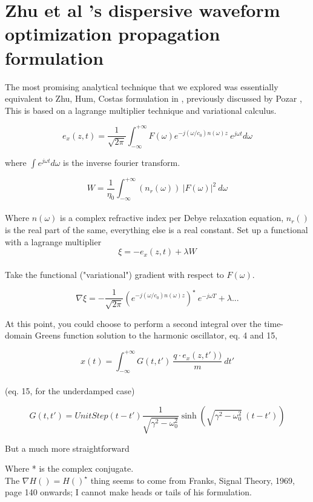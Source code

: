 \documentclass[paper.tex]{subfiles}
\begin{document}
\section{Zhu et al 's dispersive waveform optimization propagation formulation}

The most promising analytical technique that we explored was essentially equivalent to Zhu, Hum, Costas formulation in \cite{Microwave2012b}, previously discussed by Pozar \cite{Waveform2003}, This is based on a lagrange multiplier technique\cite{Methods1989} and variational calculus\footnotetext .

$$ e_x(z,t) = \frac{1}{\sqrt{2 \pi}} \int_{-\infty}^{+\infty}{F(\omega) e^{- j (\omega/c_0)n(\omega)z}\ e^{j\omega t} d\omega} $$

where $\int e^{j \omega t} d\omega$ is the inverse fourier transform.

$$W = \frac{1}{\eta_0} \int_{-\infty}^{+\infty}{(n_r(\omega))\ |F(\omega)|^2}\ d\omega$$\\

Where $n(\omega)$ is a complex refractive index per Debye relaxation equation, $n_r()$ is the real part of the same, everything else is a real constant. Set up a functional with a lagrange multiplier\\

$$\xi = -e_x(z,t) + \lambda W$$\\

Take the functional ("variational") gradient with respect to $F(\omega)$.

$$ \nabla \xi = -\frac{1}{\sqrt{2\pi}} \left(e^{- j (\omega/c_0)n(\omega)z}\right)^\star \  e^{-j\omega T} + \lambda...$$

At this point, you could choose to perform a second integral over the time-domain Greens function solution to the harmonic oscillator\cite{Complex2020}, eq. 4 and 15, 

$$x(t) = \int_{-\infty}^{+\infty}{G(t,t')\ \frac{q\cdot e_x(z,t'))}{m}\ } dt'$$\\

(eq. 15, for the underdamped case)

$$G(t,t') = UnitStep(t-t') \frac{1}{\sqrt{\gamma^2-\omega_0^2}  }\sinh\left({\sqrt{\gamma^2-\omega_0^2}}\ (t-t')\right)$$

But a much more straightforward 

Where * is the complex conjugate.\\

The $\nabla H() = H()^\star$ thing seems to come from Franks, Signal Theory, 1969, page 140 onwards; I cannot make heads or tails of his formulation.
\end{document}
